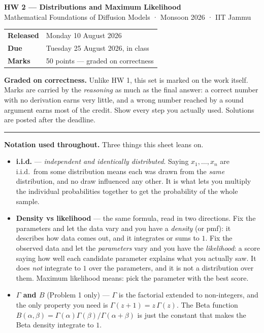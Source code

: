 \documentclass[11pt,a4paper]{article}
\begin{document}
\begin{center}
  {\Large\bfseries HW 2 — Distributions and Maximum Likelihood}\\[0.4em]
  {\small Mathematical Foundations of Diffusion Models · Monsoon 2026 · IIT Jammu}
\end{center}

\medskip
\begin{center}
\begin{tabular}{@{}ll@{}}
\toprule
\textbf{Released} & Monday 10 August 2026 \\
\textbf{Due}      & Tuesday 25 August 2026, in class \\
\textbf{Marks}    & 50 points --- graded on correctness \\
\bottomrule
\end{tabular}
\end{center}

\medskip
\noindent
\textbf{Graded on correctness.} Unlike HW 1, this set is marked on the work
itself. Marks are carried by the \emph{reasoning} as much as the final answer: a
correct number with no derivation earns very little, and a wrong number reached
by a sound argument earns most of the credit. Show every step you actually used.
Solutions are posted after the deadline.

\bigskip
\hrule
\medskip

\noindent
\textbf{Notation used throughout.} Three things this sheet leans on.

\begin{itemize}\setlength{\itemsep}{0.4em}
  \item \textbf{i.i.d.} — \emph{independent and identically distributed}. Saying
        $x_1,\dots,x_n$ are i.i.d.\ from some distribution means each was drawn
        from the \emph{same} distribution, and no draw influenced any other. It is
        what lets you multiply the individual probabilities together to get the
        probability of the whole sample.
  \item \textbf{Density vs likelihood} — the same formula, read in two
        directions. Fix the parameters and let the data vary and you have a
        \emph{density} (or pmf): it describes how data comes out, and it
        integrates or sums to $1$. Fix the observed data and let the
        \emph{parameters} vary and you have the \emph{likelihood}: a score saying
        how well each candidate parameter explains what you actually saw. It does
        \emph{not} integrate to $1$ over the parameters, and it is not a
        distribution over them. Maximum likelihood means: pick the parameter with
        the best score.
  \item \textbf{$\Gamma$ and $B$} (Problem 1 only) — $\Gamma$ is the factorial
        extended to non-integers, and the only property you need is
        $\Gamma(z+1) = z\,\Gamma(z)$. The Beta function
        $B(\alpha,\beta) = \Gamma(\alpha)\Gamma(\beta)/\Gamma(\alpha+\beta)$ is
        just the constant that makes the Beta density integrate to $1$.
\end{itemize}
\end{document}

